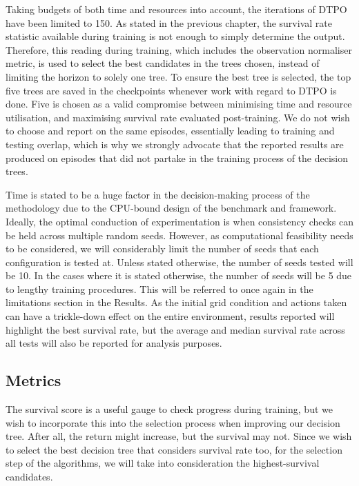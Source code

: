 Taking budgets of both time and resources into account, the iterations of DTPO have been limited to 150. As stated in the previous chapter, the survival rate statistic available during training is not enough to simply determine the output. Therefore, this reading during training, which includes the observation normaliser metric, is used to select the best candidates in the trees chosen, instead of limiting the horizon to solely one tree. To ensure the best tree is selected, the top five trees are saved in the checkpoints whenever work with regard to DTPO is done. Five is chosen as a valid compromise between minimising time and resource utilisation, and maximising survival rate evaluated post-training. We do not wish to choose and report on the same episodes, essentially leading to training and testing overlap, which is why we strongly advocate that the reported results are produced on episodes that did not partake in the training process of the decision trees. 

Time is stated to be a huge factor in the decision-making process of the methodology due to the CPU-bound design of the benchmark and framework. Ideally, the optimal conduction of experimentation is when consistency checks can be held across multiple random seeds. However, as computational feasibility needs to be considered, we will considerably limit the number of seeds that each configuration is tested at. Unless stated otherwise, the number of seeds tested will be 10. In the cases where it is stated otherwise, the number of seeds will be 5 due to lengthy training procedures. This will be referred to once again in the limitations section in the Results. As the initial grid condition and actions taken can have a trickle-down effect on the entire environment, results reported will highlight the best survival rate, but the average and median survival rate across all tests will also be reported for analysis purposes. 

\subsection{Metrics}

The survival score is a useful gauge to check progress during training, but we wish to incorporate this into the selection process when improving our decision tree. After all, the return might increase, but the survival may not. Since we wish to select the best decision tree that considers survival rate too, for the selection step of the algorithms, we will take into consideration the highest-survival candidates.

